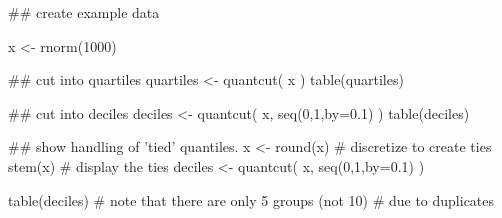 \begin{Examples}
\begin{ExampleCode}

  ## create example data
  
  x <- rnorm(1000)

  ## cut into quartiles
  quartiles <- quantcut( x )
  table(quartiles)

  ## cut into deciles
  deciles <- quantcut( x, seq(0,1,by=0.1) )
  table(deciles)

  ## show handling of 'tied' quantiles.
  x <- round(x)  # discretize to create ties
  stem(x)        # display the ties
  deciles <- quantcut( x, seq(0,1,by=0.1) )

  table(deciles) # note that there are only 5 groups (not 10) 
                 # due to duplicates

\end{ExampleCode}
\end{Examples}

